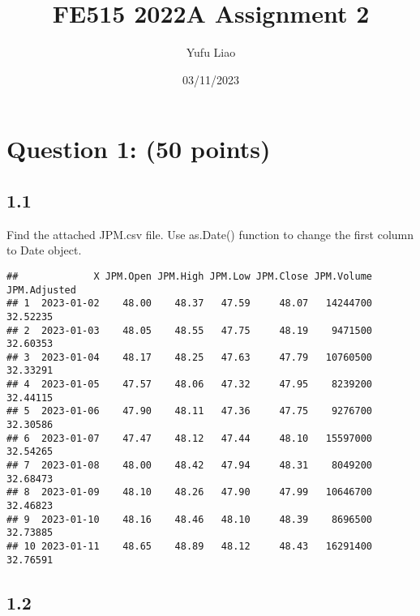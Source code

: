 \documentclass[
]{article}
\title{FE515 2022A Assignment 2}
\author{Yufu Liao}
\date{03/11/2023}
\newenvironment{Shaded}{\begin{snugshade}}{\end{snugshade}}
\newcommand{\AttributeTok}[1]{\textcolor[rgb]{0.77,0.63,0.00}{#1}}
\newcommand{\DecValTok}[1]{\textcolor[rgb]{0.00,0.00,0.81}{#1}}
\newcommand{\FunctionTok}[1]{\textcolor[rgb]{0.00,0.00,0.00}{#1}}
\newcommand{\NormalTok}[1]{#1}
\newcommand{\OtherTok}[1]{\textcolor[rgb]{0.56,0.35,0.01}{#1}}
\newcommand{\SpecialCharTok}[1]{\textcolor[rgb]{0.00,0.00,0.00}{#1}}
\newcommand{\StringTok}[1]{\textcolor[rgb]{0.31,0.60,0.02}{#1}}
\begin{document}
\maketitle

\hypertarget{question-1-50-points}{%
\section{Question 1: (50 points)}\label{question-1-50-points}}

\hypertarget{section}{%
\subsection{1.1}\label{section}}

Find the attached JPM.csv file. Use as.Date() function to change the
first column to Date object.

\begin{Shaded}
\end{Shaded}

\begin{verbatim}
##             X JPM.Open JPM.High JPM.Low JPM.Close JPM.Volume JPM.Adjusted
## 1  2023-01-02    48.00    48.37   47.59     48.07   14244700     32.52235
## 2  2023-01-03    48.05    48.55   47.75     48.19    9471500     32.60353
## 3  2023-01-04    48.17    48.25   47.63     47.79   10760500     32.33291
## 4  2023-01-05    47.57    48.06   47.32     47.95    8239200     32.44115
## 5  2023-01-06    47.90    48.11   47.36     47.75    9276700     32.30586
## 6  2023-01-07    47.47    48.12   47.44     48.10   15597000     32.54265
## 7  2023-01-08    48.00    48.42   47.94     48.31    8049200     32.68473
## 8  2023-01-09    48.10    48.26   47.90     47.99   10646700     32.46823
## 9  2023-01-10    48.16    48.46   48.10     48.39    8696500     32.73885
## 10 2023-01-11    48.65    48.89   48.12     48.43   16291400     32.76591
\end{verbatim}

\hypertarget{section-1}{%
\subsection{1.2}\label{section-1}}
\end{document}
